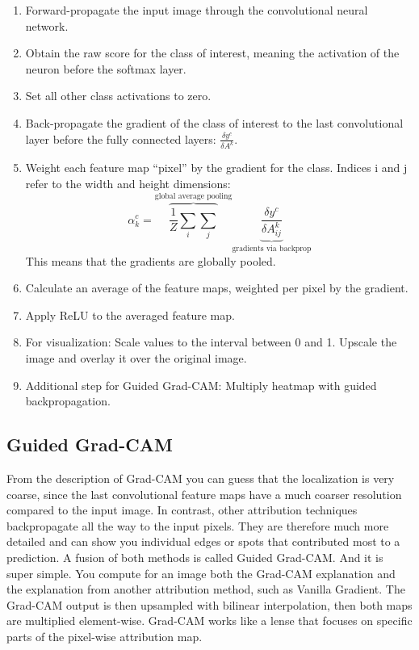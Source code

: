 \documentclass[
  11pt,
]{scrbook}
\providecommand{\tightlist}{%
  \setlength{\itemsep}{0pt}\setlength{\parskip}{0pt}}
\begin{document}
\begin{enumerate}
\def\labelenumi{\arabic{enumi}.}
\tightlist
\item
  Forward-propagate the input image through the convolutional neural network.
\item
  Obtain the raw score for the class of interest, meaning the activation of the neuron before the softmax layer.
\item
  Set all other class activations to zero.
\item
  Back-propagate the gradient of the class of interest to the last convolutional layer before the fully connected layers: \(\frac{\delta{}y^c}{\delta{}A^k}\).
\item
  Weight each feature map ``pixel'' by the gradient for the class. Indices i and j refer to the width and height dimensions:
  \[\alpha_k^c = \overbrace{\frac{1}{Z}\sum_{i}\sum_{j}}^{\text{global average pooling}} \underbrace{\frac{\delta y^c}{\delta A_{ij}^k}}_{\text{gradients via backprop}}\]
  This means that the gradients are globally pooled.
\item
  Calculate an average of the feature maps, weighted per pixel by the gradient.
\item
  Apply ReLU to the averaged feature map.
\item
  For visualization: Scale values to the interval between 0 and 1. Upscale the image and overlay it over the original image.
\item
  Additional step for Guided Grad-CAM: Multiply heatmap with guided backpropagation.
\end{enumerate}

\hypertarget{guided-grad-cam}{%
\subsection{Guided Grad-CAM}\label{guided-grad-cam}}

From the description of Grad-CAM you can guess that the localization is very coarse, since the last convolutional feature maps have a much coarser resolution compared to the input image.
In contrast, other attribution techniques backpropagate all the way to the input pixels.
They are therefore much more detailed and can show you individual edges or spots that contributed most to a prediction.
A fusion of both methods is called Guided Grad-CAM.
And it is super simple.
You compute for an image both the Grad-CAM explanation and the explanation from another attribution method, such as Vanilla Gradient.
The Grad-CAM output is then upsampled with bilinear interpolation, then both maps are multiplied element-wise.
Grad-CAM works like a lense that focuses on specific parts of the pixel-wise attribution map.
\end{document}
